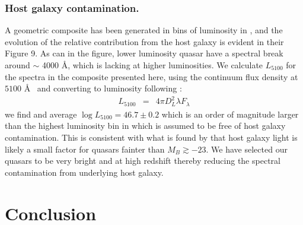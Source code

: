 \documentclass{aa}    %
\newcommand{\eqlabel}[1]{\label{eq:#1}}
\newcommand{\sectlabel}[1]{\label{sect:#1}}
\begin{document}
{ \subsubsection{Host galaxy contamination.}  \sectlabel{Host galaxy contamination.}
A geometric composite has been generated in bins of luminosity in \citet{Shen2011}, and the evolution of the relative contribution from the host galaxy is evident in their Figure 9. As can in the figure, lower luminosity quasar have a spectral break around $\sim$ 4000 \AA, which is lacking at higher luminosities. We calculate $L_{5100}$ for the spectra in the composite presented here, using the continuum flux density at $5100$ \AA~ and converting to luminosity following \cite{Netzer2007}:
\begin{eqnarray}\eqlabel{l5100}
L_{5100} &=&    4 \pi D_{L} ^{2} \lambda  F_{\lambda}
\end{eqnarray}
we find and average $\log L_{5100} = 46.7 \pm 0.2$ which is an order of magnitude larger than the highest luminosity bin in \cite{Shen2011} which is assumed to be free of host galaxy contamination. This
is consistent with what is found by \citet{Hopkins2007} that host galaxy light is likely a small factor for quasars fainter than $M_{B} \gtrsim -23$. We have selected our quasars to be very bright and at high redshift thereby reducing the spectral contamination from underlying host galaxy. 









\section{Conclusion}  \sectlabel{conclusion}




}
\end{document}
